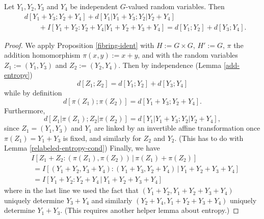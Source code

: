 \begin{corollary}\label{cor-fibre}
  \leanok
  Let $Y_1,Y_2,Y_3$ and $Y_4$ be independent $G$-valued random variables.
  Then
\begin{align*}
  & d[Y_1+Y_3; Y_2+Y_4] + d[Y_1|Y_1+Y_3; Y_2|Y_2+Y_4] \\
  &\qquad + I[ Y_1+Y_2 : Y_2 + Y_4 | Y_1+Y_2+Y_3+Y_4 ] = d[Y_1; Y_2] + d[ Y_3; Y_4].
\end{align*}
\end{corollary}

\begin{proof}
  \leanok
  We apply Proposition \ref{fibring-ident} with $H := G \times G$, $H' := G$, $\pi$ the addition homomorphism $\pi(x,y) := x+y$, and with the random variables $Z_1 := (Y_1,Y_3)$ and $Z_2 := (Y_2,Y_4)$.  Then by independence (Lemma \ref{add-entropy})
\[
  d[Z_1; Z_2] = d[Y_1; Y_2] + d[Y_3; Y_4]
\]
while by definition
\[
  d[\pi(Z_1); \pi(Z_2)] = d[Y_1+Y_3; Y_2+Y_4].
\]
Furthermore,
\[
  d[Z_1|\pi(Z_1); Z_2|\pi(Z_2)] = d[Y_1|Y_1+Y_3;Y_2|Y_2+Y_4],
\]
since $Z_1=(Y_1,Y_3)$ and $Y_1$ are linked by an invertible affine transformation once $\pi(Z_1)=Y_1+Y_3$ is fixed, and similarly for $Z_2$ and $Y_2$.  (This has to do with Lemma \ref{relabeled-entropy-cond})
Finally, we have
\begin{align*}
  &I[Z_1 + Z_2 : (\pi(Z_1),\pi(Z_2)) \,|\, \pi(Z_1) + \pi(Z_2)] \\
  &\ = I[(Y_1+Y_2, Y_3+Y_4) : (Y_1+Y_3, Y_2+Y_4) \,|\, Y_1+Y_2+Y_3+Y_4] \\
  &\ = I[Y_1+Y_2 : Y_2+Y_4 \,|\, Y_1+Y_2+Y_3+Y_4]
\end{align*}
where in the last line we used the fact that $(Y_1+Y_2, Y_1+Y_2+Y_3+Y_4)$ uniquely determine $Y_3+Y_4$ and similarly
$(Y_2+Y_4, Y_1+Y_2+Y_3+Y_4)$ uniquely determine $Y_1+Y_3$.  (This requires another helper lemma about entropy.)
\end{proof}
